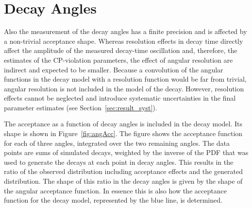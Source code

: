 \section{Decay Angles}
\label{sec:ana_angles}

Also the measurement of the decay angles has a finite precision and is affected by a non-trivial acceptance shape. Whereas resolution
effects in decay time directly affect the amplitude of the measured decay-time oscillation and, therefore, the estimates of the
CP-violation parameters, the effect of angular resolution are indirect and expected to be smaller. Because a convolution of the angular
functions in the decay model with a resolution function would be far from trivial, angular resolution is not included in the model of the
decay. However, resolution effects cannot be neglected and introduce systematic uncertainties in the final parameter estimates (see
Section~\ref{sec:result_syst}).

The acceptance as a function of decay angles is included in the decay model. Its shape is shown in Figure~\ref{fig:angAcc}. The figure
shows the acceptance function for each of three angles, integrated over the two remaining angles. The data points are sums of simulated
decays, weighted by the inverse of the PDF that was used to generate the decays at each point in decay angles. This results in the ratio of
the observed distribution including acceptance effects and the generated distribution. The shape of this ratio in the decay angles is given
by the shape of the angular acceptance function. In essence this is also how the acceptance function for the decay model, represented by
the blue line, is determined.

